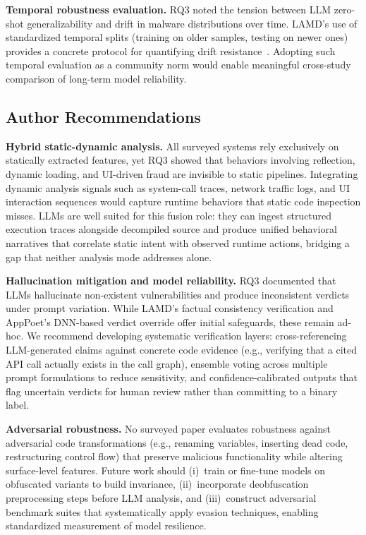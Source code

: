 \textbf{Temporal robustness evaluation.}
RQ3 noted the tension between LLM zero-shot generalizability and drift in malware distributions over time. LAMD's use of standardized temporal splits (training on older samples, testing on newer ones) provides a concrete protocol for quantifying drift resistance~\cite{Qian2025-ua}. Adopting such temporal evaluation as a community norm would enable meaningful cross-study comparison of long-term model reliability.

\subsection{Author Recommendations}
\leavevmode\par
\textbf{Hybrid static-dynamic analysis.}
All surveyed systems rely exclusively on statically extracted features, yet RQ3 showed that behaviors involving reflection, dynamic loading, and UI-driven fraud are invisible to static pipelines. Integrating dynamic analysis signals such as system-call traces, network traffic logs, and UI interaction sequences would capture runtime behaviors that static code inspection misses. LLMs are well suited for this fusion role: they can ingest structured execution traces alongside decompiled source and produce unified behavioral narratives that correlate static intent with observed runtime actions, bridging a gap that neither analysis mode addresses alone.

\textbf{Hallucination mitigation and model reliability.}
RQ3 documented that LLMs hallucinate non-existent vulnerabilities and produce inconsistent verdicts under prompt variation. While LAMD's factual consistency verification and AppPoet's DNN-based verdict override offer initial safeguards, these remain ad-hoc. We recommend developing systematic verification layers: cross-referencing LLM-generated claims against concrete code evidence (e.g., verifying that a cited API call actually exists in the call graph), ensemble voting across multiple prompt formulations to reduce sensitivity, and confidence-calibrated outputs that flag uncertain verdicts for human review rather than committing to a binary label.

\textbf{Adversarial robustness.}
No surveyed paper evaluates robustness against adversarial code transformations (e.g., renaming variables, inserting dead code, restructuring control flow) that preserve malicious functionality while altering surface-level features. Future work should (i)~train or fine-tune models on obfuscated variants to build invariance, (ii)~incorporate deobfuscation preprocessing steps before LLM analysis, and (iii)~construct adversarial benchmark suites that systematically apply evasion techniques, enabling standardized measurement of model resilience.

